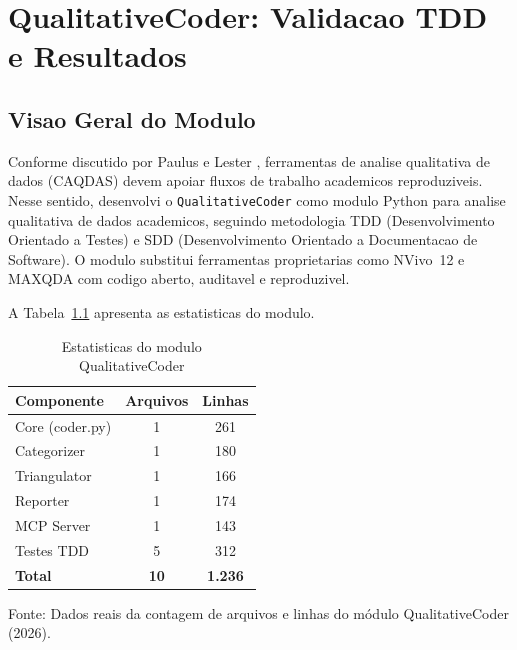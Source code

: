 
\chapter{QualitativeCoder: Validacao TDD e Resultados}
\label{apx:qualitative_coder}

\section{Visao Geral do Modulo}
\label{sec:qc_visao_geral}

Conforme discutido por Paulus e Lester \cite{PAULUS2023}, ferramentas de analise qualitativa de dados (CAQDAS) devem apoiar fluxos de trabalho academicos reproduziveis. Nesse sentido, desenvolvi o \texttt{QualitativeCoder} como modulo Python para analise qualitativa de dados academicos, seguindo metodologia TDD (Desenvolvimento Orientado a Testes) e SDD (Desenvolvimento Orientado a Documentacao de Software). O modulo substitui ferramentas proprietarias como NVivo~12 e MAXQDA \cite{DAHAL2026} com codigo aberto, auditavel e reproduzivel.

A Tabela~\ref{tab:qc_estatisticas} apresenta as estatisticas do modulo.

\begin{table}[htbp]
    \centering
    \caption{Estatisticas do modulo QualitativeCoder}
    \label{tab:qc_estatisticas}
    \small
    \begin{tabular}{lcc}
        \toprule
        \textbf{Componente} & \textbf{Arquivos} & \textbf{Linhas} \\
        \midrule
        Core (coder.py) & 1 & 261 \\
        Categorizer & 1 & 180 \\
        Triangulator & 1 & 166 \\
        Reporter & 1 & 174 \\
        MCP Server & 1 & 143 \\
        Testes TDD & 5 & 312 \\
        \midrule
        \textbf{Total} & \textbf{10} & \textbf{1.236} \\
        \bottomrule
    \end{tabular}
    \par\medskip
    \footnotesize{Fonte: Dados reais da contagem de arquivos e linhas do módulo QualitativeCoder (2026).}
\end{table}

